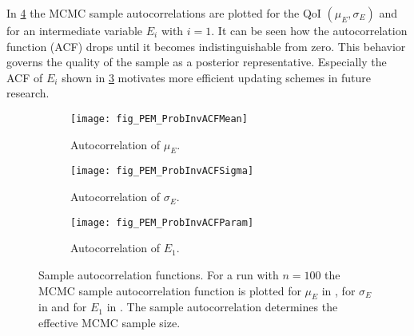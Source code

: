 \par %
In \cref{fig:PEM:ProbInv:ACF} the MCMC sample autocorrelations are plotted for the QoI \((\mu_E,\sigma_E)\) and for an intermediate variable \(E_i\) with \(i=1\).
It can be seen how the autocorrelation function (ACF) drops until it becomes indistinguishable from zero.
This behavior governs the quality of the sample as a posterior representative.
Especially the ACF of \(E_i\) shown in \cref{fig:PEM:ProbInv:ACF:Param} motivates more efficient updating schemes in future research.
\begin{figure}[ht]
  \centering
  \begin{subfigure}[b]{0.33\textwidth}
    \centering
    \texttt{[image: fig\_PEM\_ProbInvACFMean]}
    \caption{Autocorrelation of \(\mu_E\).}
    \label{fig:PEM:ProbInv:ACF:Mean}
  \end{subfigure}%
  \begin{subfigure}[b]{0.33\textwidth}
    \centering
    \texttt{[image: fig\_PEM\_ProbInvACFSigma]}
    \caption{Autocorrelation of \(\sigma_E\).}
    \label{fig:PEM:ProbInv:ACF:Sigma}
  \end{subfigure}%
  \begin{subfigure}[b]{0.33\textwidth}
    \centering
    \texttt{[image: fig\_PEM\_ProbInvACFParam]}
    \caption{Autocorrelation of \(E_1\).}
    \label{fig:PEM:ProbInv:ACF:Param}
  \end{subfigure}%
  \caption[Sample autocorrelation functions]{Sample autocorrelation functions.
           For a run with \(n=100\) the MCMC sample autocorrelation function is plotted for \(\mu_E\) in ,
           for \(\sigma_E\) in  and for \(E_1\) in .
           The sample autocorrelation determines the effective MCMC sample size.
           }
  \label{fig:PEM:ProbInv:ACF}
\end{figure}

